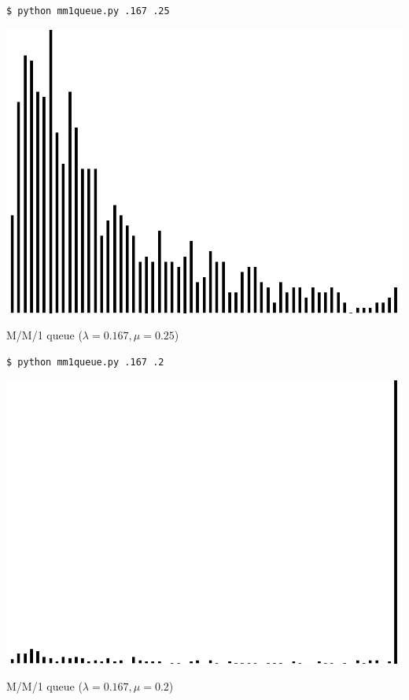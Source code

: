 \documentclass[8pt,a4paper,compress,handout]{beamer}
\begin{document}
\begin{frame}[fragile]
\begin{minipage}{200pt}
\begin{lstlisting}[language={}]
$ python mm1queue.py .167 .25
\end{lstlisting}
\end{minipage}%
\hfill
\begin{minipage}{100pt}
\begin{center}
\includegraphics[scale=0.15]{figures/mm1queue1.png}

\smallskip

\tiny M/M/1 queue ($\lambda=0.167, \mu=0.25$)
\end{center}
\end{minipage}%

\bigskip

\begin{minipage}{200pt}
\begin{lstlisting}[language={}]
$ python mm1queue.py .167 .2
\end{lstlisting}
\end{minipage}%
\hfill
\begin{minipage}{100pt}
\begin{center}
\includegraphics[scale=0.15]{figures/mm1queue2.png}

\smallskip

\tiny M/M/1 queue ($\lambda=0.167, \mu=0.2$)
\end{center}
\end{minipage}
\end{frame}
\end{document}

